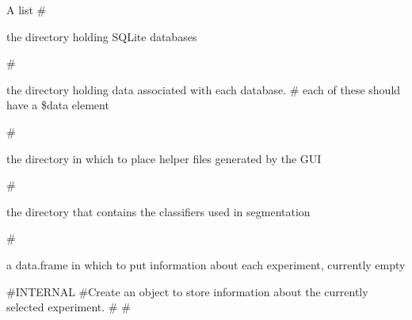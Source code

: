 \documentclass[a4paper]{book}
\begin{document}
\begin{Value}
A list \#\begin{ldescription}
\item[\code{db.directory}] the directory holding SQLite
databases\end{ldescription}
\#\begin{ldescription}
\item[\code{data.directory}] the directory holding
data associated with each database. \# each of these
should have a \bsl{}\$data element
\end{ldescription}
\#\begin{ldescription}
\item[\code{helper.directory}] the directory in which to place
helper files generated by the GUI
\end{ldescription}
\#\begin{ldescription}
\item[\code{classifier.direcoty}] the directory that contains
the classifiers used in segmentation\end{ldescription}
\#\begin{ldescription}
\item[\code{expdf}] a
data.frame in which to put information about each
experiment, currently empty\end{ldescription}
\#INTERNAL \#Create an object
to store information about the currently selected
experiment. \# \#


\end{Value}
\end{document}
